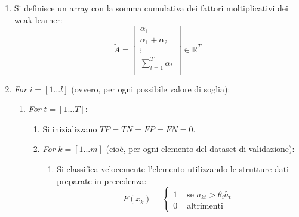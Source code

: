 \begin{enumerate}
                \item Si definisce un array con la somma cumulativa dei fattori moltiplicativi dei weak learner:
                \begin{equation}
                    \label{subeq:multipliers_cum_sum}
                    \widetilde{A} = \left[
                    \begin{array}{c}
                        \alpha_1 \\
                        \alpha_1 + \alpha_2 \\
                        \vdots \\
                        \sum_{t = 1}^{T} \alpha_t \\
                    \end{array}
                    \right] \in \mathbb{R}^T
                \end{equation}

                \item \emph{For} $i = [1...l]$ (ovvero, per ogni possibile valore di soglia):
                \begin{enumerate}

                    \item \emph{For} $t = [1...T]:$
                    \begin{enumerate}
                        
                        \item Si inizializzano $TP = TN = FP = FN = 0$.

                        \item \emph{For} $k = [1...m]$ (cioè, per ogni elemento del dataset di validazione):
                            \begin{enumerate}
                                
                                \item Si classifica velocemente l'elemento utilizzando le strutture dati preparate in precedenza:
                                \begin{equation}
                                    \label{subeq:element_fast_classification}
                                    F(x_k) = 
                                    \begin{cases}
                                        1 & \text{ se } a_{kt} > \theta_i \widetilde{a_t} \\
                                        0 & \text{ altrimenti }
                                    \end{cases}
                                \end{equation}


\end{enumerate}
\end{enumerate}
\end{enumerate}
\end{enumerate}
